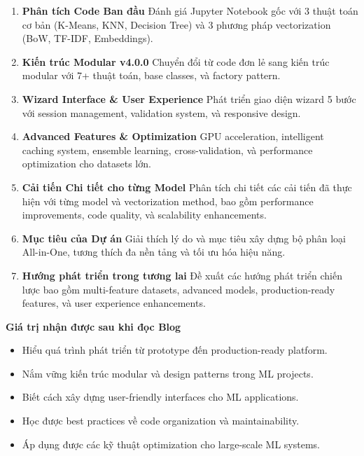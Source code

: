 \documentclass[a4paper,12pt]{article}
\begin{document}
\vspace{1em}
\begin{enumerate}
    \item \textbf{Phân tích Code Ban đầu}  
    Đánh giá Jupyter Notebook gốc với 3 thuật toán cơ bản (K-Means, KNN, Decision Tree) và 3 phương pháp vectorization (BoW, TF-IDF, Embeddings).

    \item \textbf{Kiến trúc Modular v4.0.0}  
    Chuyển đổi từ code đơn lẻ sang kiến trúc modular với 7+ thuật toán, base classes, và factory pattern.

    \item \textbf{Wizard Interface \& User Experience}  
    Phát triển giao diện wizard 5 bước với session management, validation system, và responsive design.

    \item \textbf{Advanced Features \& Optimization}  
    GPU acceleration, intelligent caching system, ensemble learning, cross-validation, và performance optimization cho datasets lớn.

    \item \textbf{Cải tiến Chi tiết cho từng Model}  
    Phân tích chi tiết các cải tiến đã thực hiện với từng model và vectorization method, bao gồm performance improvements, code quality, và scalability enhancements.

    \item \textbf{Mục tiêu của Dự án}  
    Giải thích lý do và mục tiêu xây dựng bộ phân loại All-in-One, tương thích đa nền tảng và tối ưu hóa hiệu năng.

    \item \textbf{Hướng phát triển trong tương lai}  
    Đề xuất các hướng phát triển chiến lược bao gồm multi-feature datasets, advanced models, production-ready features, và user experience enhancements.
\end{enumerate}

\vspace{1em}
\noindent\textbf{ Giá trị nhận được sau khi đọc Blog}
\begin{itemize}
    \item Hiểu quá trình phát triển từ prototype đến production-ready platform.  
    \item Nắm vững kiến trúc modular và design patterns trong ML projects.  
    \item Biết cách xây dựng user-friendly interfaces cho ML applications.  
    \item Học được best practices về code organization và maintainability.  
    \item Áp dụng được các kỹ thuật optimization cho large-scale ML systems.  
\end{itemize}
\end{document}
